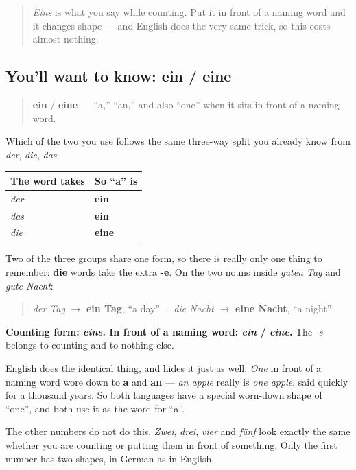 \label{lesson:GE-C06-ein-eine}



\begin{quote}
\emph{Eins} is what you say while counting. Put it in front of a naming word and it changes shape — and English does the very same trick, so this costs almost nothing.
\end{quote}

\subsection*{You'll want to know: ein / eine}
\begin{quote}
\textbf{ein} / \textbf{eine} — \textquotedblleft{}a,\textquotedblright{} \textquotedblleft{}an,\textquotedblright{} and also \textquotedblleft{}one\textquotedblright{} when it sits in front of a naming word.
\end{quote}

Which of the two you use follows the same three-way split you already know from \emph{der}, \emph{die}, \emph{das}:

\noindent
\begin{tabularx}{\linewidth}{@{}>{\raggedright\arraybackslash}X>{\raggedright\arraybackslash}X@{}}
\toprule
\textbf{The word takes} & \textbf{So \textquotedblleft{}a\textquotedblright{} is} \\
\midrule
\emph{der} & \textbf{ein} \\
\emph{das} & \textbf{ein} \\
\emph{die} & \textbf{eine} \\
\bottomrule
\end{tabularx}

Two of the three groups share one form, so there is really only one thing to remember: \textbf{die} words take the extra \textbf{-e}. On the two nouns inside \emph{guten Tag} and \emph{gute Nacht}:

\begin{quote}
\emph{der Tag} $\to$ \textbf{ein Tag}, \textquotedblleft{}a day\textquotedblright{} · \emph{die Nacht} $\to$ \textbf{eine Nacht}, \textquotedblleft{}a night\textquotedblright{}
\end{quote}

\begin{grammarlens}[title={Grammar Lens: the counting -s drops}]
\textbf{Counting form: \emph{eins}. In front of a naming word: \emph{ein} / \emph{eine}.} The \emph{-s} belongs to counting and to nothing else.

English does the identical thing, and hides it just as well. \emph{One} in front of a naming word wore down to \textbf{a} and \textbf{an} — \emph{an apple} really is \emph{one apple}, said quickly for a thousand years. So both languages have a special worn-down shape of \textquotedblleft{}one\textquotedblright{}, and both use it as the word for \textquotedblleft{}a\textquotedblright{}.

The other numbers do not do this. \emph{Zwei}, \emph{drei}, \emph{vier} and \emph{fünf} look exactly the same whether you are counting or putting them in front of something. Only the first number has two shapes, in German as in English.
\end{grammarlens}

